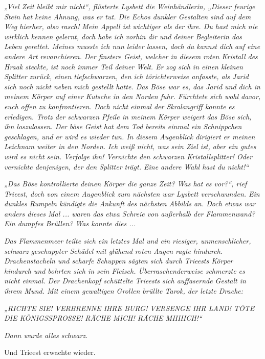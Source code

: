 \textit{„Viel Zeit bleibt mir nicht“, flüsterte Lysbett die Weinhändlerin, „Dieser feurige Stein hat keine Ahnung, was er tut. Die Echos dunkler Gestalten sind auf dem Weg hierher, also rasch! Mein Appell ist wichtiger als der ihre. Du hast mich nie wirklich kennen gelernt, doch habe ich vorhin dir und deiner Begleiterin das Leben gerettet. Meines musste ich nun leider lassen, doch du kannst dich auf eine andere Art revanchieren. Der finstere Geist, welcher in diesem roten Kristall des Hraak steckte, ist noch immer Teil deiner Welt. Er zog sich in einen kleinen Splitter zurück, einen tiefschwarzen, den ich törichterweise anfasste, als Jarid sich noch nicht neben mich gestellt hatte. Das Böse war es, das Jarid und dich in meinem Körper auf einer Kutsche in den Norden fuhr. Fürchtete sich wohl davor, euch offen zu konfrontieren. Doch nicht einmal der Skralangriff konnte es erledigen. Trotz der schwarzen Pfeile in meinem Körper weigert das Böse sich, ihn loszulassen. Der böse Geist hat dem Tod bereits einmal ein Schnippchen geschlagen, und er wird es wieder tun. In diesem Augenblick dirigiert er meinen Leichnam weiter in den Norden. Ich weiß nicht, was sein Ziel ist, aber ein gutes wird es nicht sein. Verfolge ihn! Vernichte den schwarzen Kristallsplitter! Oder vernichte denjenigen, der den Splitter trägt. Eine andere Wahl hast du nicht!“}

\textit{„Das Böse kontrollierte deinen Körper die ganze Zeit? Was hat es vor?“, rief Trieest, doch von einem Augenblick zum nächsten war Lysbett verschwunden. Ein dunkles Rumpeln kündigte die Ankunft des nächsten Abbilds an. Doch etwas war anders dieses Mal ... waren das etwa Schreie von außerhalb der Flammenwand? Ein dumpfes Brüllen? Was konnte dies ...}\bigskip



\textit{Das Flammenmeer teilte sich ein letztes Mal und ein riesiger, unmenschlicher, schwarz geschuppter Schädel mit glühend roten Augen ragte hindurch. Drachenstacheln und scharfe Schuppen sägten sich durch Trieests Körper hindurch und bohrten sich in sein Fleisch. Überraschenderweise schmerzte es nicht einmal. Der Drachenkopf schüttelte Trieests sich auffasernde Gestalt in ihrem Mund. Mit einem gewaltigen Grollen brüllte Tarok, der letzte Drache:}

\textit{„RICHTE SIE! VERBRENNE IHRE BURG! VERSENGE IHR LAND! TÖTE DIE KÖNIGSSPROSSE! RÄCHE MICH! RÄCHE MIIIIICH!“}

\textit{Dann wurde alles schwarz.}

Und Trieest erwachte wieder.\bigskip







